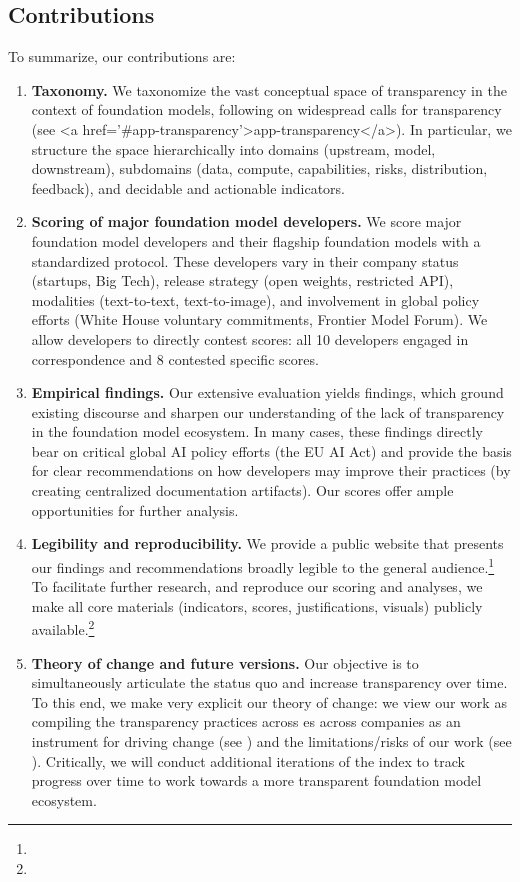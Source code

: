 \hypertarget{contributions}{\subsection{Contributions}}
\label{sec:contributions}
To summarize, our contributions are:
\begin{enumerate}
\item \textbf{Taxonomy.}
We taxonomize the vast conceptual space of transparency in the context of foundation models, following on widespread calls for transparency (see <a href='#app-transparency'>app-transparency</a>).
In particular, we structure the space hierarchically into \numdomains domains (\ie upstream, model, downstream), \numsubdomains subdomains (\eg data, compute, capabilities, risks, distribution, feedback), and \numindicators decidable and actionable indicators.
\item \textbf{Scoring of major foundation model developers.}
We score \numcompanies major foundation model developers and their flagship foundation models with a standardized protocol.
These developers vary in their company status (\eg startups, Big Tech), release strategy (\eg open weights, restricted API), modalities (\eg text-to-text, text-to-image), and involvement in global policy efforts (\eg White House voluntary commitments, Frontier Model Forum).
We allow developers to directly contest scores: all 10 developers engaged in correspondence and 8 contested specific scores.
\item \textbf{Empirical findings.}
Our extensive evaluation yields \numtotalfindings findings, which ground existing discourse and sharpen our understanding of the lack of transparency in the foundation model ecosystem.
In many cases, these findings directly bear on critical global AI policy efforts (\eg the EU AI Act) and provide the basis for clear recommendations on how developers may improve their practices (\eg by creating centralized documentation artifacts).
Our scores offer ample opportunities for further analysis. 
\item \textbf{Legibility and reproducibility.}
We provide a public website that presents our findings and recommendations broadly legible to the general audience.\footnote{\indexUrl}
To facilitate further research, and reproduce our scoring and analyses, we make all core materials (\eg indicators, scores, justifications, visuals) publicly available.\footnote{\materialsUrl}
\item \textbf{Theory of change and future versions.}
Our objective is to simultaneously articulate the status quo and increase transparency over time.
To this end, we make very explicit our theory of change: we view our work as compiling the transparency practices across es across companies as an instrument for driving change (see ) and the limitations/risks of our work (see ).
Critically, we will conduct additional iterations of the index to track progress over time to work towards a more transparent foundation model ecosystem.
\end{enumerate}
\clearpage